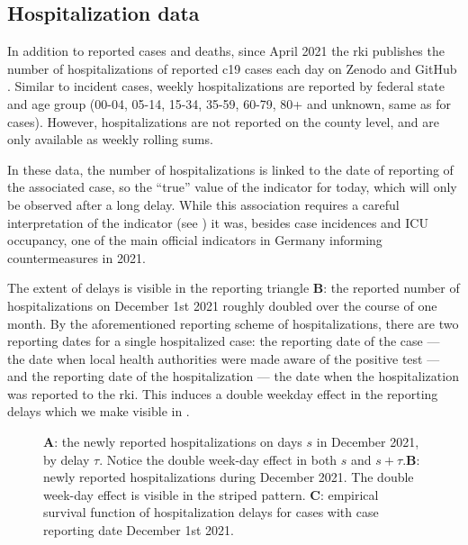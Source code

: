 \subsection{Hospitalization data}
In addition to reported cases and deaths, since April 2021 the \acrshort{rki} publishes the number of hospitalizations of reported \acrshort{c19} cases each day on Zenodo \citep{RobertKoch-Institut2024COVID19Hospitalisierungen} and GitHub \citep{RobertKoch-Institut2024COVID19Hospitalisierungena}. 
Similar to incident cases, weekly hospitalizations are reported by federal state and age group (00-04, 05-14, 15-34, 35-59, 60-79, 80+ and unknown, same as for cases). However, hospitalizations are not reported on the county level, and are only available as weekly rolling sums.

In these data, the number of hospitalizations is linked to the date of reporting of the associated case, so the ``true'' value of the indicator for today, which will only be observed after a long delay. While this association requires a careful interpretation of the indicator (see ) it was, besides case incidences and ICU occupancy, one of the main official indicators in Germany informing countermeasures in 2021.

The extent of delays is visible in the reporting triangle  \textbf{B}: the reported number of hospitalizations on December 1st 2021 roughly doubled over the course of one month. By the aforementioned reporting scheme of hospitalizations, there are two reporting dates for a single hospitalized case: the reporting date of the case --- the date when local health authorities were made aware of the positive test --- and the reporting date of the hospitalization --- the date when the hospitalization was reported to the \acrshort{rki}. This induces a double weekday effect in the reporting delays which we make visible in .

\begin{figure}
    \resizebox{\textwidth}{!}{%
    }
    \caption{\textbf{A}: the newly reported hospitalizations on days $s$ in December 2021, by delay $\tau$. Notice the double week-day effect in both $s$ and $s+\tau$.\textbf{B}: newly reported hospitalizations during December 2021. The double week-day effect is visible in the striped pattern. \textbf{C}: empirical survival function of hospitalization delays for cases with case reporting date December 1st 2021.}
    \label{fig:double_weekday_effect_hosp}
\end{figure}

